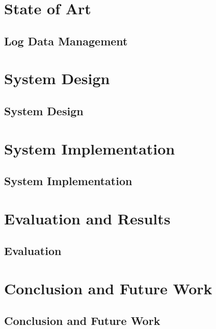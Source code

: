 \documentclass[article,type=msc,colorback,accentcolor=tud7b]{tudthesis}
\begin{document}
 \section{State of Art}

    
	\subsection{Log Data Management}	
	
	
 \cleardoublepage
 \section{System Design}	
 \subsection{System Design}

 \cleardoublepage
 \section{System Implementation}
 \subsection{System Implementation}

 \cleardoublepage	  
 \section{Evaluation and Results}	  
 \subsection{Evaluation}
 
 \cleardoublepage
 \section{Conclusion and Future Work}	  
 \subsection{Conclusion and Future Work}

\clearpage
	  


\end{document}

